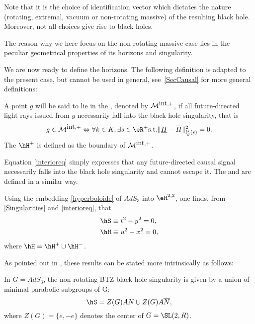 Note that it is the choice of identification vector which dictates the nature (rotating, extremal, vacuum or non-rotating massive) of the resulting black hole. Moreover, not all choices give rise to black holes.

The reason why we here focus on the non-rotating massive case lies in the peculiar geometrical properties of its horizons and singularity.

We are now ready to define the horizons. The following definition is adapted to the present case, but cannot be used in general, see~\ref{SecCausal} for more general definitions:

\begin{definition}
	A point $g$ will be said to lie in the , denoted by ${\cal M}^{\mbox{int},+}$, if all future-directed light rays issued from $g$ necessarily fall into the black hole singularity, that is
	\begin{equation}\label{interioreq}
		g \in {\cal M}^{\mbox{int},+} \Leftrightarrow \forall k \in K, \exists s \in
		\eR^+  \mbox{s.t.}  \|\underline{H} - \overline{H}\|^2_{l^k_g (s)}=0.
	\end{equation}
	The  $\hH^+$ is defined as the boundary of ${\cal M}^{\mbox{int},+}$.
	\label{interior-horizons}
\end{definition}
Equation \eqref{interioreq} simply expresses that any future-directed causal signal necessarily falls into the black hole singularity and cannot escape it. The  and  are defined in a similar way.

Using the embedding \eqref{hyperboloide} of $AdS_3$ into $\eR^{2,2}$, one finds, from \eqref{Singularities} and \eqref{interioreq}, that
\begin{equation}		\label{BTZSingHor}
	\begin{aligned}[]
		\hS & \equiv t^2 - y^2 = 0, \\
		\hH & \equiv u^2 - x^2 = 0,
	\end{aligned}
\end{equation}
where $\hH = \hH^+ \cup \hH^-$.

As pointed out in \cite{Keio}, these results can be stated more intrinsically as follows:
\begin{proposition}
	In $G=AdS_3$, the non-rotating BTZ black hole singularity is given by a union of minimal parabolic subgroups of G:
	\begin{equation}
		\hS = Z(G) A N \cup Z(G) A \overline{N},
	\end{equation}
	where $Z(G)=\{e,-e\}$ denotes the center of $G=\SL(2,R)$.
	\label{BTZSing}
\end{proposition}

